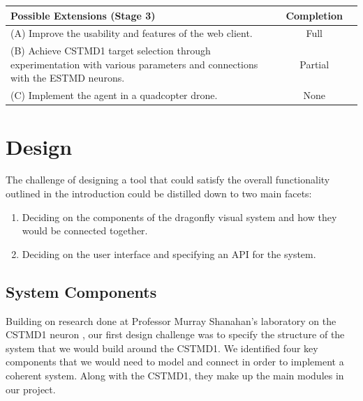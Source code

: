 \documentclass[a4paper,11pt]{article}
\begin{document}
\begin{center}
    \begin{tabular}{p{12cm} c c}
    \textbf{Possible Extensions (Stage 3)} & \textbf{Completion} \\ \hline
	(A) Improve the usability and features of the web client. & Full\\
	(B) Achieve CSTMD1 target selection through experimentation with various parameters and connections with the ESTMD neurons. & Partial\\
	(C) Implement the agent in a quadcopter drone. & None\\
    \end{tabular}
\end{center}






\clearpage
\section{Design}

The challenge of designing a tool that could satisfy the overall functionality outlined in the introduction could be distilled down to two main facets:
\begin{enumerate}
\item Deciding on the components of the dragonfly visual system and how they would be connected together.
\item Deciding on the user interface and specifying an API for the system.
\end{enumerate}

\subsection{System Components}

Building on research done at Professor Murray Shanahan's laboratory on the CSTMD1 neuron \cite{?}, our first design challenge was to specify the structure of the system that we would build around the CSTMD1. We identified four key components that we would need to model and connect in order to implement a coherent system. Along with the CSTMD1, they make up the main modules in our project.
\end{document}

